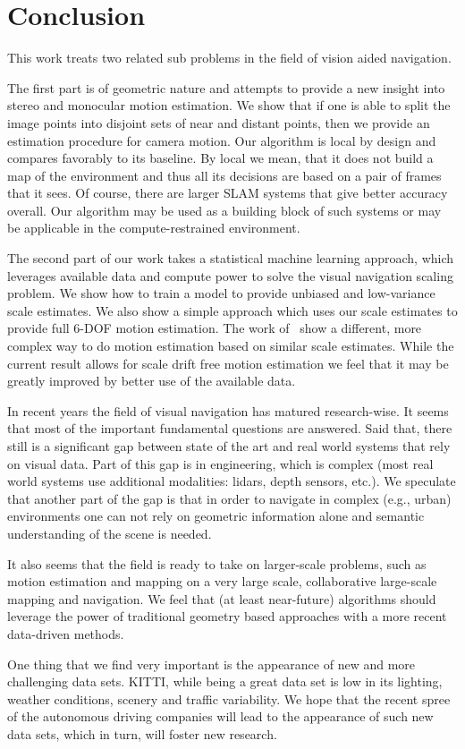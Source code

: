 \chapter{Conclusion}

This work treats two related sub problems in the field of vision aided
navigation.

The first part is of geometric nature and attempts to provide a new
insight into stereo and monocular motion estimation.  We show that if
one is able to split the image points into disjoint sets of near and
distant points, then we provide an estimation procedure for camera
motion.  Our algorithm is local by design and compares favorably to
its baseline.  By local we mean, that it does not build a map of the
environment and thus all its decisions are based on a pair of frames
that it sees.  Of course, there are larger SLAM systems that give
better accuracy overall.  Our algorithm may be used as a building
block of such systems or may be applicable in the compute-restrained
environment.

The second part of our work takes a statistical machine learning
approach, which leverages available data and compute power to solve
the visual navigation scaling problem.  We show how to train a model
to provide unbiased and low-variance scale estimates.  We also show a
simple approach which uses our scale estimates to provide full 6-DOF
motion estimation.  The work of~\cite{frost2017using} show a
different, more complex way to do motion estimation based on similar
scale estimates.  While the current result allows for scale drift free
motion estimation we feel that it may be greatly improved by better
use of the available data.

In recent years the field of visual navigation has matured
research-wise. It seems that most of the important fundamental
questions are answered.  Said that, there still is a significant gap
between state of the art and real world systems that rely on visual
data.  Part of this gap is in engineering, which is complex (most real
world systems use additional modalities: lidars, depth sensors,
etc.). We speculate that another part of the gap is that in order to
navigate in complex (e.g., urban) environments one can not rely on
geometric information alone and semantic understanding of the scene is
needed.

It also seems that the field is ready to take on larger-scale
problems, such as motion estimation and mapping on a very large scale,
collaborative large-scale mapping and navigation.  We feel that (at
least near-future) algorithms should leverage the power of traditional
geometry based approaches with a more recent data-driven methods.

One thing that we find very important is the appearance of new and
more challenging data sets.  KITTI, while being a great data set is
low in its lighting, weather conditions, scenery and traffic
variability.  We hope that the recent spree of the autonomous driving
companies will lead to the appearance of such new data sets, which in
turn, will foster new research.

